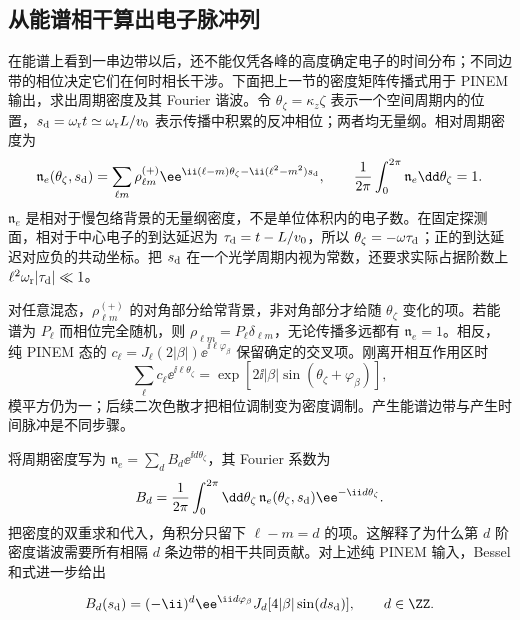 \subsection{从能谱相干算出电子脉冲列}
\label{sec:electron-temporal-bunching-worked}

在能谱上看到一串边带以后，还不能仅凭各峰的高度确定电子的时间分布；不同边带的相位决定它们在何时相长干涉。下面把上一节的密度矩阵传播式用于 PINEM 输出，求出周期密度及其 Fourier 谐波。令 $\theta_\zeta=\kappa_z\zeta$ 表示一个空间周期内的位置，$s_{\rm d}=\omega_{\rm r}t\simeq\omega_{\rm r}L/v_0$ 表示传播中积累的反冲相位；两者均无量纲。相对周期密度为
\begin{equation}
 \mathfrak n_e(\theta_\zeta,s_{\rm d})
 =\sum_{\ell m}\rho_{\ell m}^{(+)}
 \ee^{\ii(\ell-m)\theta_\zeta-\ii(\ell^2-m^2)s_{\rm d}},\qquad
 \frac1{2\pi}\int_0^{2\pi}\mathfrak n_e\dd\theta_\zeta=1.
 \label{eq:electron-bunching-normalized-density}
\end{equation}
$\mathfrak n_e$ 是相对于慢包络背景的无量纲密度，不是单位体积内的电子数。在固定探测面，相对于中心电子的到达延迟为 $\tau_{\rm d}=t-L/v_0$，所以 $\theta_\zeta=-\omega\tau_{\rm d}$；正的到达延迟对应负的共动坐标。把 $s_{\rm d}$ 在一个光学周期内视为常数，还要求实际占据阶数上 $\ell^2\omega_{\rm r}|\tau_{\rm d}|\ll1$。

对任意混态，$\rho_{\ell m}^{(+)}$ 的对角部分给常背景，非对角部分才给随 $\theta_\zeta$ 变化的项。若能谱为 $P_\ell$ 而相位完全随机，则 $\rho_{\ell m}=P_\ell\delta_{\ell m}$，无论传播多远都有 $\mathfrak n_e=1$。相反，纯 PINEM 态的 $c_\ell=J_\ell(2|\beta|)\ee^{\ii\ell\varphi_\beta}$ 保留确定的交叉项。刚离开相互作用区时
\begin{equation*}
 \sum_\ell c_\ell\ee^{\ii\ell\theta_\zeta}
 =\exp[2\ii|\beta|\sin(\theta_\zeta+\varphi_\beta)],
\end{equation*}
模平方仍为一；后续二次色散才把相位调制变为密度调制。产生能谱边带与产生时间脉冲是不同步骤。

将周期密度写为 $\mathfrak n_e=\sum_d B_d\ee^{\ii d\theta_\zeta}$，其 Fourier 系数为
\[
B_d=\frac1{2\pi}\int_0^{2\pi}\dd\theta_\zeta\,
\mathfrak n_e(\theta_\zeta,s_{\rm d})\ee^{-\ii d\theta_\zeta}.
\]
把密度的双重求和代入，角积分只留下 $\ell-m=d$ 的项。这解释了为什么第 $d$ 阶密度谐波需要所有相隔 $d$ 条边带的相干共同贡献。对上述纯 PINEM 输入，Bessel 和式进一步给出
\begin{proposition}
\begin{equation}
 B_d(s_{\rm d})=(-\ii)^d\ee^{\ii d\varphi_\beta}
 J_d[4|\beta|\sin(ds_{\rm d})],\qquad d\in\ZZ.
 \label{eq:electron-pinem-bunching-closed}\end{equation}
\end{proposition}

